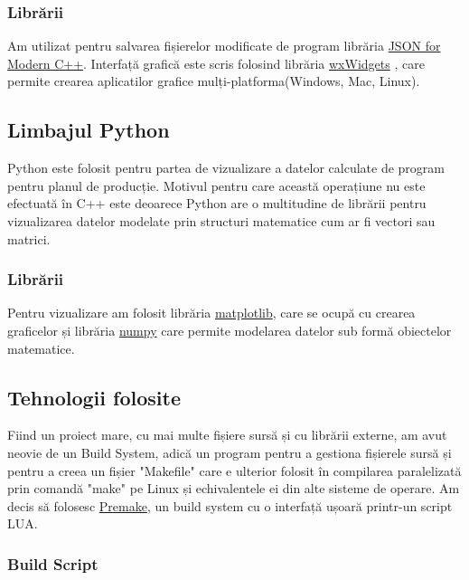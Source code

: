 \documentclass[12pt, twoside]{article}
\begin{document}


\subsubsection{Librării}
Am utilizat pentru salvarea fișierelor modificate de program
librăria \href{https://github.com/nlohmann/json}{JSON for Modern C++}.
\newline
Interfață grafică este scris folosind librăria 
\href{https://www.wxwidgets.org/}{wxWidgets}
, care permite crearea aplicatilor grafice
mulți-platforma(Windows, Mac, Linux).

\subsection{Limbajul Python}
Python este folosit pentru partea de vizualizare a datelor
calculate de program pentru planul de producție. Motivul pentru
care această operațiune nu este efectuată în C++ este deoarece
Python are o multitudine de librării pentru vizualizarea datelor
modelate prin structuri matematice cum ar fi vectori sau matrici.

\subsubsection{Librării}
Pentru vizualizare am folosit librăria \href{https://matplotlib.org/}{matplotlib}, care 
se ocupă cu crearea graficelor și librăria \href{https://numpy.org/}{numpy} care
permite modelarea datelor sub formă obiectelor matematice.

\subsection{Tehnologii folosite}
Fiind un proiect mare, cu mai multe fișiere sursă și cu
librării externe, am avut neovie de un Build System, adică
un program pentru a gestiona fișierele sursă și pentru a 
creea un fișier "Makefile" care e ulterior folosit în compilarea
paralelizată prin comandă "make" pe Linux și echivalentele ei
din alte sisteme de operare. \newline
Am decis să folosesc \href{https://premake.github.io/}{Premake},
un build system cu o interfață ușoară printr-un script LUA.
\subsubsection{Build Script}
\end{document}
